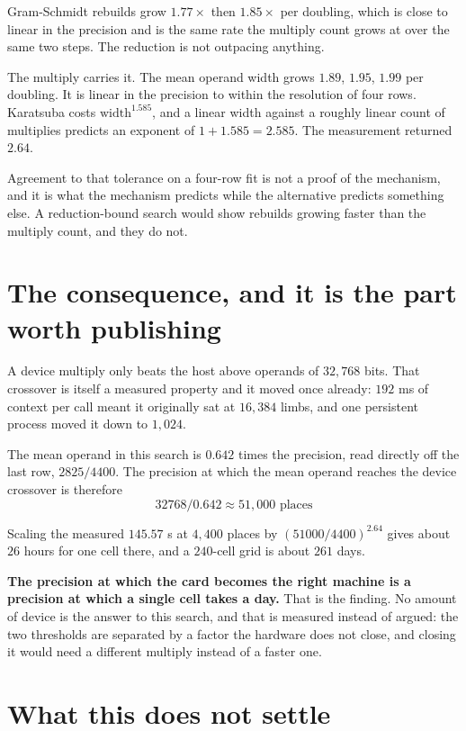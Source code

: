 Gram-Schmidt rebuilds grow \(1.77\times\) then \(1.85\times\) per doubling, which is close to linear in the precision and is the same rate the multiply count grows at over the same two steps. The reduction is not outpacing anything.

The multiply carries it. The mean operand width grows \(1.89\), \(1.95\), \(1.99\) per doubling. It is linear in the precision to within the resolution of four rows. Karatsuba costs \(\mathrm{width}^{1.585}\), and a linear width against a roughly linear count of multiplies predicts an exponent of \(1 + 1.585 = 2.585\). The measurement returned \(2.64\).

Agreement to that tolerance on a four-row fit is not a proof of the mechanism, and it is what the mechanism predicts while the alternative predicts something else. A reduction-bound search would show rebuilds growing faster than the multiply count, and they do not.

\section{The consequence, and it is the part worth publishing}

A device multiply only beats the host above operands of \(32{,}768\) bits. That crossover is itself a measured property and it moved once already: \(192\) ms of context per call meant it originally sat at \(16{,}384\) limbs, and one persistent process moved it down to \(1{,}024\).

The mean operand in this search is \(0.642\) times the precision, read directly off the last row, \(2825/4400\). The precision at which the mean operand reaches the device crossover is therefore
\[
32768 / 0.642 \approx 51{,}000 \text{ places}
\]

Scaling the measured \(145.57\) s at \(4{,}400\) places by \((51000/4400)^{2.64}\) gives about \(26\) hours for one cell there, and a \(240\)-cell grid is about \(261\) days.

\textbf{The precision at which the card becomes the right machine is a precision at which a single cell takes a day.} That is the finding. No amount of device is the answer to this search, and that is measured instead of argued: the two thresholds are separated by a factor the hardware does not close, and closing it would need a different multiply instead of a faster one.

\section{What this does not settle}

